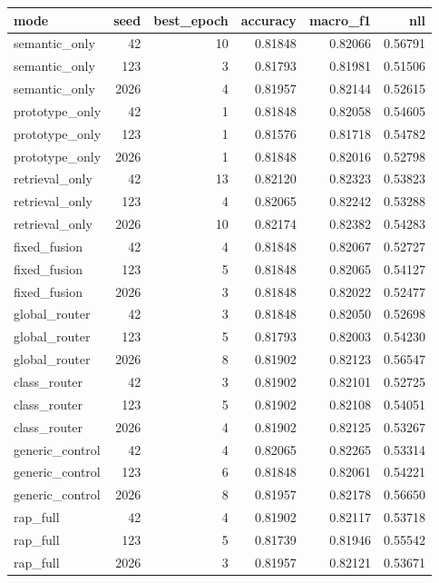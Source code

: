\begin{tabular}{lrrrrr}
\toprule
mode & seed & best_epoch & accuracy & macro_f1 & nll \\
\midrule
semantic_only & 42 & 10 & 0.81848 & 0.82066 & 0.56791 \\
semantic_only & 123 & 3 & 0.81793 & 0.81981 & 0.51506 \\
semantic_only & 2026 & 4 & 0.81957 & 0.82144 & 0.52615 \\
prototype_only & 42 & 1 & 0.81848 & 0.82058 & 0.54605 \\
prototype_only & 123 & 1 & 0.81576 & 0.81718 & 0.54782 \\
prototype_only & 2026 & 1 & 0.81848 & 0.82016 & 0.52798 \\
retrieval_only & 42 & 13 & 0.82120 & 0.82323 & 0.53823 \\
retrieval_only & 123 & 4 & 0.82065 & 0.82242 & 0.53288 \\
retrieval_only & 2026 & 10 & 0.82174 & 0.82382 & 0.54283 \\
fixed_fusion & 42 & 4 & 0.81848 & 0.82067 & 0.52727 \\
fixed_fusion & 123 & 5 & 0.81848 & 0.82065 & 0.54127 \\
fixed_fusion & 2026 & 3 & 0.81848 & 0.82022 & 0.52477 \\
global_router & 42 & 3 & 0.81848 & 0.82050 & 0.52698 \\
global_router & 123 & 5 & 0.81793 & 0.82003 & 0.54230 \\
global_router & 2026 & 8 & 0.81902 & 0.82123 & 0.56547 \\
class_router & 42 & 3 & 0.81902 & 0.82101 & 0.52725 \\
class_router & 123 & 5 & 0.81902 & 0.82108 & 0.54051 \\
class_router & 2026 & 4 & 0.81902 & 0.82125 & 0.53267 \\
generic_control & 42 & 4 & 0.82065 & 0.82265 & 0.53314 \\
generic_control & 123 & 6 & 0.81848 & 0.82061 & 0.54221 \\
generic_control & 2026 & 8 & 0.81957 & 0.82178 & 0.56650 \\
rap_full & 42 & 4 & 0.81902 & 0.82117 & 0.53718 \\
rap_full & 123 & 5 & 0.81739 & 0.81946 & 0.55542 \\
rap_full & 2026 & 3 & 0.81957 & 0.82121 & 0.53671 \\
\bottomrule
\end{tabular}
